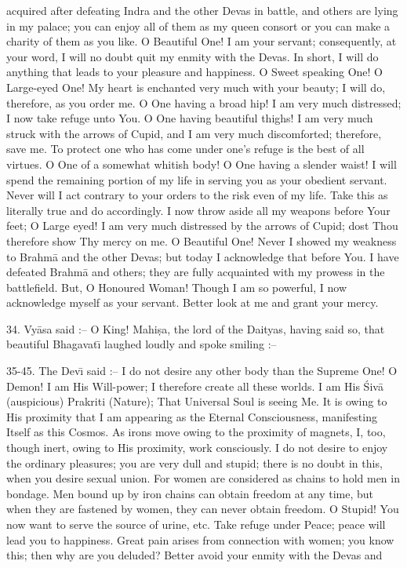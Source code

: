 acquired after defeating Indra and the other Devas in battle, and others are lying in my palace; you can enjoy all of them as my queen consort or you can make a charity of them as you like. O Beautiful One! I am your servant; consequently, at your word, I will no doubt quit my enmity with the Devas. In short, I will do anything that leads to your pleasure and happiness. O Sweet speaking One! O Large-eyed One! My heart is enchanted very much with your beauty; I will do, therefore, as you order me. O One having a broad hip! I am very much distressed; I now take refuge unto You. O One having beautiful thighs! I am very much struck with the arrows of Cupid, and I am very much discomforted; therefore, save me. To protect one who has come under one's refuge is the best of all virtues. O One of a somewhat whitish body! O One having a slender waist! I will spend the remaining portion of my life in serving you as your obedient servant. Never will I act contrary to your orders to the risk even of my life. Take this as literally true and do accordingly. I now throw aside all my weapons before Your feet; O Large eyed! I am very much distressed by the arrows of Cupid; dost Thou therefore show Thy mercy on me. O Beautiful One! Never I showed my weakness to Brahm\=a and the other Devas; but today I acknowledge that before You. I have defeated Brahm\=a and others; they are fully acquainted with my prowess in the battlefield. But, O Honoured Woman! Though I am so powerful, I now acknowledge myself as your servant. Better look at me and grant your mercy.

34. Vy\=asa said :-- O King! Mahi\d{s}a, the lord of the Daityas, having said so, that beautiful Bhagavat\={\i} laughed loudly and spoke smiling :--

35-45. The Dev\={\i} said :-- I do not desire any other body than the Supreme One! O Demon! I am His Will-power; I therefore create all these worlds. I am His \'Siv\=a (auspicious) Prakriti (Nature); That Universal Soul is seeing Me. It is owing to His proximity that I am appearing as the Eternal Consciousness, manifesting Itself as this Cosmos. As irons move owing to the proximity of magnets, I, too, though inert, owing to His proximity, work consciously. I do not desire to enjoy the ordinary pleasures; you are very dull and stupid; there is no doubt in this, when you desire sexual union. For women are considered as chains to hold men in bondage. Men bound up by iron chains can obtain freedom at any time, but when they are fastened by women, they can never obtain freedom. O Stupid! You now want to serve the source of urine, etc. Take refuge under Peace; peace will lead you to happiness. Great pain arises from connection with women; you know this; then why are you deluded? Better avoid your enmity with the Devas and

